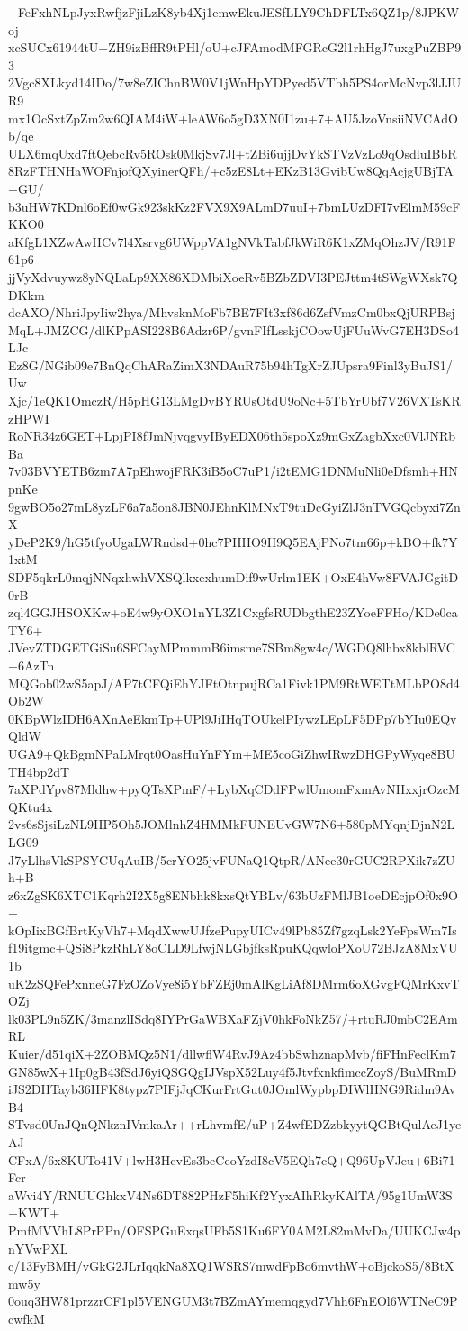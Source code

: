 +FeFxhNLpJyxRwfjzFjiLzK8yb4Xj1emwEkuJESfLLY9ChDFLTx6QZ1p/8JPKWoj
xcSUCx61944tU+ZH9izBffR9tPHl/oU+cJFAmodMFGRcG2l1rhHgJ7uxgPuZBP93
2Vgc8XLkyd14IDo/7w8eZIChnBW0V1jWnHpYDPyed5VTbh5PS4orMcNvp3lJJUR9
mx1OcSxtZpZm2w6QIAM4iW+leAW6o5gD3XN0I1zu+7+AU5JzoVnsiiNVCAdOb/qe
ULX6mqUxd7ftQebcRv5ROsk0MkjSv7Jl+tZBi6ujjDvYkSTVzVzLo9qOsdluIBbR
8RzFTHNHaWOFnjofQXyinerQFh/+c5zE8Lt+EKzB13GvibUw8QqAcjgUBjTA+GU/
b3uHW7KDnl6oEf0wGk923skKz2FVX9X9ALmD7uuI+7bmLUzDFI7vElmM59cFKKO0
aKfgL1XZwAwHCv7l4Xsrvg6UWppVA1gNVkTabfJkWiR6K1xZMqOhzJV/R91F61p6
jjVyXdvuywz8yNQLaLp9XX86XDMbiXoeRv5BZbZDVI3PEJttm4tSWgWXsk7QDKkm
dcAXO/NhriJpyIiw2hya/MhvsknMoFb7BE7FIt3xf86d6ZsfVmzCm0bxQjURPBsj
MqL+JMZCG/dlKPpASI228B6Adzr6P/gvnFIfLsskjCOowUjFUuWvG7EH3DSo4LJc
Ez8G/NGib09e7BnQqChARaZimX3NDAuR75b94hTgXrZJUpsra9Finl3yBuJS1/Uw
Xjc/1eQK1OmczR/H5pHG13LMgDvBYRUsOtdU9oNc+5TbYrUbf7V26VXTsKRzHPWI
RoNR34z6GET+LpjPI8fJmNjvqgvyIByEDX06th5spoXz9mGxZagbXxc0VlJNRbBa
7v03BVYETB6zm7A7pEhwojFRK3iB5oC7uP1/i2tEMG1DNMuNli0eDfsmh+HNpnKe
9gwBO5o27mL8yzLF6a7a5on8JBN0JEhnKlMNxT9tuDcGyiZlJ3nTVGQcbyxi7ZnX
yDeP2K9/hG5tfyoUgaLWRndsd+0hc7PHHO9H9Q5EAjPNo7tm66p+kBO+fk7Y1xtM
SDF5qkrL0mqjNNqxhwhVXSQlkxexhumDif9wUrlm1EK+OxE4hVw8FVAJGgitD0rB
zql4GGJHSOXKw+oE4w9yOXO1nYL3Z1CxgfsRUDbgthE23ZYoeFFHo/KDe0caTY6+
JVevZTDGETGiSu6SFCayMPmmmB6imsme7SBm8gw4c/WGDQ8lhbx8kblRVC+6AzTn
MQGob02wS5apJ/AP7tCFQiEhYJFtOtnpujRCa1Fivk1PM9RtWETtMLbPO8d4Ob2W
0KBpWlzIDH6AXnAeEkmTp+UPl9JiIHqTOUkelPIywzLEpLF5DPp7bYIu0EQvQldW
UGA9+QkBgmNPaLMrqt0OasHuYnFYm+ME5coGiZhwIRwzDHGPyWyqe8BUTH4bp2dT
7aXPdYpv87Mldhw+pyQTsXPmF/+LybXqCDdFPwlUmomFxmAvNHxxjrOzcMQKtu4x
2vs6sSjsiLzNL9IIP5Oh5JOMlnhZ4HMMkFUNEUvGW7N6+580pMYqnjDjnN2LLG09
J7yLlhsVkSPSYCUqAuIB/5crYO25jvFUNaQ1QtpR/ANee30rGUC2RPXik7zZUh+B
z6xZgSK6XTC1Kqrh2I2X5g8ENbhk8kxsQtYBLv/63bUzFMlJB1oeDEcjpOf0x9O+
kOpIixBGfBrtKyVh7+MqdXwwUJfzePupyUICv49lPb85Zf7gzqLsk2YeFpsWm7Is
f19itgmc+QSi8PkzRhLY8oCLD9LfwjNLGbjfksRpuKQqwloPXoU72BJzA8MxVU1b
uK2zSQFePxnneG7FzOZoVye8i5YbFZEj0mAlKgLiAf8DMrm6oXGvgFQMrKxvTOZj
lk03PL9n5ZK/3manzlISdq8IYPrGaWBXaFZjV0hkFoNkZ57/+rtuRJ0mbC2EAmRL
Kuier/d51qiX+2ZOBMQz5N1/dllwflW4RvJ9Az4bbSwhznapMvb/fiFHnFeclKm7
GN85wX+1Ip0gB43fSdJ6yiQSGQgIJVspX52Luy4f5JtvfxnkfimccZoyS/BuMRmD
iJS2DHTayb36HFK8typz7PIFjJqCKurFrtGut0JOmlWypbpDIWlHNG9Ridm9AvB4
STvsd0UnJQnQNkznIVmkaAr++rLhvmfE/uP+Z4wfEDZzbkyytQGBtQulAeJ1yeAJ
CFxA/6x8KUTo41V+lwH3HcvEs3beCeoYzdI8cV5EQh7cQ+Q96UpVJeu+6Bi71Fcr
aWvi4Y/RNUUGhkxV4Ns6DT882PHzF5hiKf2YyxAIhRkyKAlTA/95g1UmW3S+KWT+
PmfMVVhL8PrPPn/OFSPGuExqsUFb5S1Ku6FY0AM2L82mMvDa/UUKCJw4pnYVwPXL
c/13FyBMH/vGkG2JLrIqqkNa8XQ1WSRS7mwdFpBo6mvthW+oBjckoS5/8BtXmw5y
0ouq3HW81przzrCF1pl5VENGUM3t7BZmAYmemqgyd7Vhh6FnEOl6WTNeC9PcwfkM
